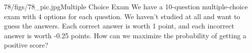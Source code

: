 \begin{problem}{78/figs/78_pic.jpg}{Multiple Choice Exam} We have a 10-question multiple-choice exam with 4 options for each question. We haven't studied at all and want to guess the answers. Each correct answer is worth 1 point, and each incorrect answer is worth -0.25 points.
	How can we maximize the probability of getting a positive score?
\end{problem}
